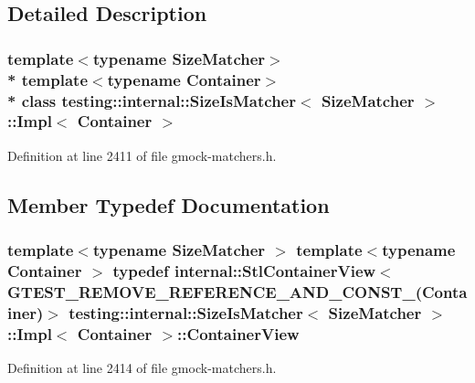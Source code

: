 \subsection{Detailed Description}
\subsubsection*{template$<$typename Size\+Matcher$>$\\*
template$<$typename Container$>$\\*
class testing\+::internal\+::\+Size\+Is\+Matcher$<$ Size\+Matcher $>$\+::\+Impl$<$ Container $>$}



Definition at line 2411 of file gmock-\/matchers.\+h.



\subsection{Member Typedef Documentation}
\subsubsection[{\texorpdfstring{Container\+View}{ContainerView}}]{\setlength{\rightskip}{0pt plus 5cm}template$<$typename Size\+Matcher $>$ template$<$typename Container $>$ typedef {\bf internal\+::\+Stl\+Container\+View}$<$ {\bf G\+T\+E\+S\+T\+\_\+\+R\+E\+M\+O\+V\+E\+\_\+\+R\+E\+F\+E\+R\+E\+N\+C\+E\+\_\+\+A\+N\+D\+\_\+\+C\+O\+N\+S\+T\+\_\+}(Container)$>$ {\bf testing\+::internal\+::\+Size\+Is\+Matcher}$<$ Size\+Matcher $>$\+::{\bf Impl}$<$ Container $>$\+::{\bf Container\+View}}\hypertarget{classtesting_1_1internal_1_1_size_is_matcher_1_1_impl_ae848755998eaaaa5e38366a2fc8b55e2}{}\label{classtesting_1_1internal_1_1_size_is_matcher_1_1_impl_ae848755998eaaaa5e38366a2fc8b55e2}


Definition at line 2414 of file gmock-\/matchers.\+h.

